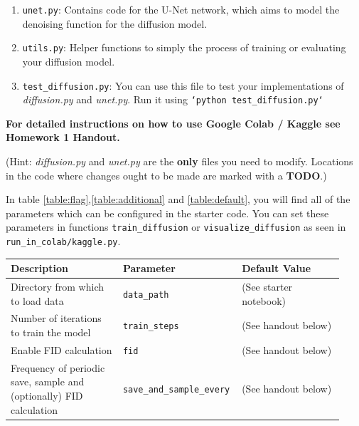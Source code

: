 \documentclass[11pt,addpoints,answers]{exam}
\begin{document}
\begin{questions}
\begin{enumerate}
    \item \lstinline{unet.py}: Contains code for the U-Net network, which aims to model the denoising function for the diffusion model.

    \item \lstinline{utils.py}: Helper functions to simply the process of training or evaluating your diffusion model.

    \item \lstinline{test_diffusion.py}: You can use this file to test your implementations of \textit{diffusion.py} and \textit{unet.py}. Run it using \texttt{`python test\_diffusion.py`}
    
\end{enumerate}

\textbf{ For detailed instructions on how to use Google Colab / Kaggle see Homework 1 Handout.}

(Hint: \textit{diffusion.py} and \textit{unet.py} are the \textbf{only} files you need to modify. Locations in the code where changes ought to be made are marked with a \textbf{TODO}.)


In table \ref{table:flag},\ref{table:additional} and \ref{table:default}, you will find all of the parameters which can be configured in the starter code. You can set these parameters in functions \lstinline{train_diffusion} or \lstinline{visualize_diffusion} as seen in \lstinline{run_in_colab/kaggle.py}.



\begin{table}[H]
\centering
\begin{tabular}{|p{0.33\linewidth}|p{0.3\linewidth}|p{0.3\linewidth}|}
\hline
Description & Parameter & Default Value \\ \hline
Directory from which to load data &  \lstinline|data_path| & (See starter notebook) \\ \hline
Number of iterations to train the model &  \lstinline|train_steps| & (See handout below) \\ \hline
Enable FID calculation  &  \lstinline|fid| & (See handout below) \\ \hline
Frequency of periodic save, sample and (optionally) FID calculation  &  \lstinline|save_and_sample_every| & (See handout below) \\ \hline


\end{tabular}
\end{table}
\end{questions}
\end{document}
